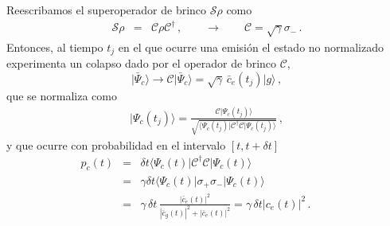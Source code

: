 \documentclass[twocolumn,aps,eqsecnum,showkeys,amsmath]{revtex4}
\newcommand{\mcC}{\mathcal{C}}
\newcommand{\mcS}{\mathcal{S}}
\providecommand{\bra}[1]{\langle #1 \rvert}
\providecommand{\ket}[1]{\lvert #1 \rangle}
\begin{document}
Reescribamos el superoperador de brinco $\mcS \rho$ como 
%
\begin{eqnarray} 
\mcS \rho &=&  \mcC \rho \mcC^\dag \,, 	\qquad \to \qquad 
	\mcC = \sqrt{\gamma} \sigma_- 	\,. 
\end{eqnarray}
Entonces, al tiempo $t_j$ en el que ocurre una emisi\'on el estado no 
normalizado experimenta un colapso dado por el operador de brinco 
$\mcC$,  
%
\begin{equation}
\ket{ \bar{\Psi}_c } \to \mcC \ket{ \bar{\Psi}_c } 
	= \sqrt{\gamma}\, \bar{c}_e (t_j) \ket{g} 	\,,
\end{equation}
que se normaliza como 
\begin{eqnarray} 	\label{jump}
\ket{\Psi_c(t_j)} = \frac{\mcC \ket{\Psi_c(t_j) } }
  	 {\sqrt{\bra{\Psi_c(t_j)}  \mcC^\dag \mcC \ket{\Psi_c(t_j)} } } \,,	
\end{eqnarray}
y que ocurre con probabilidad en el intervalo $[t, t+ \delta t]$ 
%
\begin{eqnarray} 	\label{JumpProb}
p_c(t) &=& \delta t \bra{\Psi_c (t)} \mcC^\dag \mcC \ket{\Psi_c (t)} 	\\ 
	&=& \gamma \delta t \bra{\Psi_c (t)} \sigma_+ \sigma_- \ket{\Psi_c (t)}
	\nonumber 	\\ 
&=& \gamma\, \delta t \, \frac{|\bar{c}_e(t)|^2}
	{|\bar{c}_g(t)|^2 +|\bar{c}_e(t)|^2} = \gamma\, \delta t |c_e(t)|^2	\,. 	
	\qquad 	\label{eq:jumpProb2LA}
\end{eqnarray}
\end{document}

